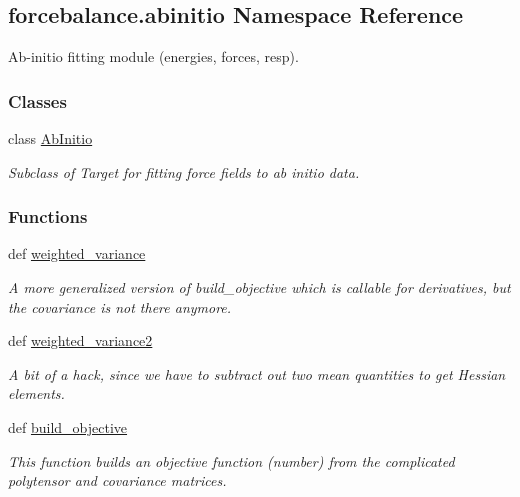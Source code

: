 \hypertarget{namespaceforcebalance_1_1abinitio}{\subsection{forcebalance.\-abinitio Namespace Reference}
\label{namespaceforcebalance_1_1abinitio}
}


Ab-\/initio fitting module (energies, forces, resp).  


\subsubsection*{Classes}
\begin{DoxyCompactItemize}
\item 
class \hyperlink{classforcebalance_1_1abinitio_1_1AbInitio}{Ab\-Initio}
\begin{DoxyCompactList}\small\item\em Subclass of Target for fitting force fields to ab initio data. \end{DoxyCompactList}\end{DoxyCompactItemize}
\subsubsection*{Functions}
\begin{DoxyCompactItemize}
\item 
def \hyperlink{namespaceforcebalance_1_1abinitio_aba970cb59bab95eec79027ea05655110}{weighted\-\_\-variance}
\begin{DoxyCompactList}\small\item\em A more generalized version of build\-\_\-objective which is callable for derivatives, but the covariance is not there anymore. \end{DoxyCompactList}\item 
def \hyperlink{namespaceforcebalance_1_1abinitio_ab9554761125a4ec7c3c13d6ae4ea537d}{weighted\-\_\-variance2}
\begin{DoxyCompactList}\small\item\em A bit of a hack, since we have to subtract out two mean quantities to get Hessian elements. \end{DoxyCompactList}\item 
def \hyperlink{namespaceforcebalance_1_1abinitio_aadd1d6c5a34c82d495d6be7380b73601}{build\-\_\-objective}
\begin{DoxyCompactList}\small\item\em This function builds an objective function (number) from the complicated polytensor and covariance matrices. \end{DoxyCompactList}\end{DoxyCompactItemize}

